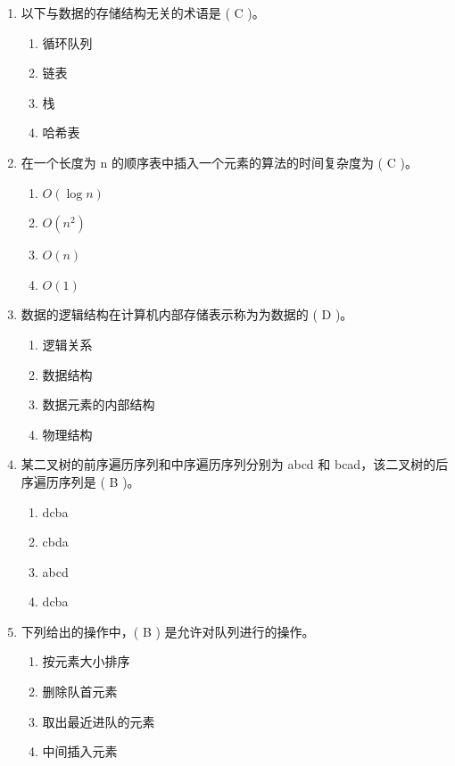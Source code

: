 \documentclass[12pt, a4paper]{article}
\begin{document}
\begin{enumerate}[label=\arabic*.]
    \item 以下与数据的存储结构无关的术语是 ( C )。
    \begin{enumerate}
        \item 循环队列
        \item 链表
        \item 栈
        \item 哈希表
    \end{enumerate}

    \item 在一个长度为 n 的顺序表中插入一个元素的算法的时间复杂度为 ( C )。
    \begin{enumerate}
        \item $O(\log n)$
        \item $O(n^2)$
        \item $O(n)$
        \item $O(1)$
    \end{enumerate}

    \item 数据的逻辑结构在计算机内部存储表示称为为数据的 ( D )。
    \begin{enumerate}
        \item 逻辑关系
        \item 数据结构
        \item 数据元素的内部结构
        \item 物理结构
    \end{enumerate}

    \item 某二叉树的前序遍历序列和中序遍历序列分别为 abcd 和 bcad，该二叉树的后序遍历序列是 ( B )。
    \begin{enumerate}
        \item dcba
        \item cbda
        \item abcd
        \item dcba
    \end{enumerate}

    \item 下列给出的操作中，( B ) 是允许对队列进行的操作。
    \begin{enumerate}
        \item 按元素大小排序
        \item 删除队首元素
        \item 取出最近进队的元素
        \item 中间插入元素
    \end{enumerate}


\end{enumerate}
\end{document}
